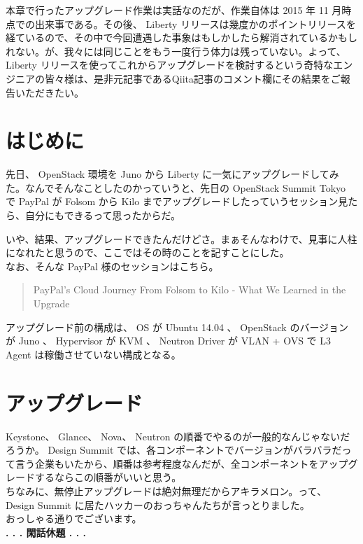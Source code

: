 \documentclass[9pt,b5paper,tombo,openany]{jsbook}
\begin{document}
本章で行ったアップグレード作業は実話なのだが、作業自体は 2015 年 11 月時点での出来事である。その後、 Liberty リリースは幾度かのポイントリリースを経ているので、その中で今回遭遇した事象はもしかしたら解消されているかもしれない。が、我々には同じことをもう一度行う体力は残っていない。よって、 Liberty リリースを使ってこれからアップグレードを検討するという奇特なエンジニアの皆々様は、是非元記事であるQiita記事のコメント欄にその結果をご報告いただきたい。

\section{はじめに}
先日、 OpenStack 環境を Juno から Liberty に一気にアップグレードしてみた。なんでそんなことしたのかっていうと、先日の OpenStack Summit Tokyo で PayPal が Folsom から Kilo までアップグレードしたっていうセッション見たら、自分にもできるって思ったからだ。

いや、結果、アップグレードできたんだけどさ。まぁそんなわけで、見事に人柱になれたと思うので、ここではその時のことを記すことにした。\\[1ex]

\noindent
なお、そんな PayPal 様のセッションはこちら。

\begin{quote}
	PayPal's Cloud Journey From Folsom to Kilo - What We Learned in the Upgrade
\end{quote}

アップグレード前の構成は、 OS が Ubuntu 14.04 、 OpenStack のバージョンが Juno 、 Hypervisor が KVM 、 Neutron Driver が VLAN + OVS で L3 Agent は稼働させていない構成となる。

\section{アップグレード}
Keystone、 Glance、 Nova、 Neutron の順番でやるのが一般的なんじゃないだろうか。 Design Summit では、各コンポーネントでバージョンがバラバラだって言う企業もいたから、順番は参考程度なんだが、全コンポーネントをアップグレードするならこの順番がいいと思う。\\[1ex]
ちなみに、無停止アップグレードは絶対無理だからアキラメロン。って、 Design Summit に居たハッカーのおっちゃんたちが言っとりました。\\[1ex]

\noindent
おっしゃる通りでございます。\\[1ex]

\noindent
\textbf{. . . 閑話休題 . . .}
\end{document}
